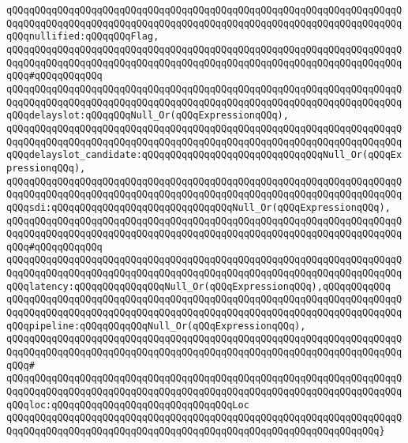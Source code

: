 \verb|qQQqqQQqqQQqqQQqqQQqqQQqqQQqqQQqqQQqqQQqqQQqqQQqqQQqqQQqqQQqqQQqqQQqqQQqqQQqqQQqqQQqqQQqqQQqqQQqqQQqqQQqqQQqqQQqqQQqqQQqqQQqqQQqqQQqqQQqqQQqqQQqnullified:qQQqqQQqFlag,|\newline
\verb|qQQqqQQqqQQqqQQqqQQqqQQqqQQqqQQqqQQqqQQqqQQqqQQqqQQqqQQqqQQqqQQqqQQqqQQqqQQqqQQqqQQqqQQqqQQqqQQqqQQqqQQqqQQqqQQqqQQqqQQqqQQqqQQqqQQqqQQqqQQqqQQq#qQQqqQQqqQQq|\newline
\verb|qQQqqQQqqQQqqQQqqQQqqQQqqQQqqQQqqQQqqQQqqQQqqQQqqQQqqQQqqQQqqQQqqQQqqQQqqQQqqQQqqQQqqQQqqQQqqQQqqQQqqQQqqQQqqQQqqQQqqQQqqQQqqQQqqQQqqQQqqQQqqQQqdelayslot:qQQqqQQqNull_Or(qQQqExpressionqQQq),|\newline
\verb|qQQqqQQqqQQqqQQqqQQqqQQqqQQqqQQqqQQqqQQqqQQqqQQqqQQqqQQqqQQqqQQqqQQqqQQqqQQqqQQqqQQqqQQqqQQqqQQqqQQqqQQqqQQqqQQqqQQqqQQqqQQqqQQqqQQqqQQqqQQqqQQqdelayslot_candidate:qQQqqQQqqQQqqQQqqQQqqQQqqQQqqQQqNull_Or(qQQqExpressionqQQq),|\newline
\verb|qQQqqQQqqQQqqQQqqQQqqQQqqQQqqQQqqQQqqQQqqQQqqQQqqQQqqQQqqQQqqQQqqQQqqQQqqQQqqQQqqQQqqQQqqQQqqQQqqQQqqQQqqQQqqQQqqQQqqQQqqQQqqQQqqQQqqQQqqQQqqQQqsdi:qQQqqQQqqQQqqQQqqQQqqQQqqQQqqQQqNull_Or(qQQqExpressionqQQq),|\newline
\verb|qQQqqQQqqQQqqQQqqQQqqQQqqQQqqQQqqQQqqQQqqQQqqQQqqQQqqQQqqQQqqQQqqQQqqQQqqQQqqQQqqQQqqQQqqQQqqQQqqQQqqQQqqQQqqQQqqQQqqQQqqQQqqQQqqQQqqQQqqQQqqQQq#qQQqqQQqqQQq|\newline
\verb|qQQqqQQqqQQqqQQqqQQqqQQqqQQqqQQqqQQqqQQqqQQqqQQqqQQqqQQqqQQqqQQqqQQqqQQqqQQqqQQqqQQqqQQqqQQqqQQqqQQqqQQqqQQqqQQqqQQqqQQqqQQqqQQqqQQqqQQqqQQqqQQqlatency:qQQqqQQqqQQqqQQqNull_Or(qQQqExpressionqQQq),qQQqqQQqqQQq|\newline
\verb|qQQqqQQqqQQqqQQqqQQqqQQqqQQqqQQqqQQqqQQqqQQqqQQqqQQqqQQqqQQqqQQqqQQqqQQqqQQqqQQqqQQqqQQqqQQqqQQqqQQqqQQqqQQqqQQqqQQqqQQqqQQqqQQqqQQqqQQqqQQqqQQqpipeline:qQQqqQQqqQQqNull_Or(qQQqExpressionqQQq),|\newline
\verb|qQQqqQQqqQQqqQQqqQQqqQQqqQQqqQQqqQQqqQQqqQQqqQQqqQQqqQQqqQQqqQQqqQQqqQQqqQQqqQQqqQQqqQQqqQQqqQQqqQQqqQQqqQQqqQQqqQQqqQQqqQQqqQQqqQQqqQQqqQQqqQQq#|\newline
\verb|qQQqqQQqqQQqqQQqqQQqqQQqqQQqqQQqqQQqqQQqqQQqqQQqqQQqqQQqqQQqqQQqqQQqqQQqqQQqqQQqqQQqqQQqqQQqqQQqqQQqqQQqqQQqqQQqqQQqqQQqqQQqqQQqqQQqqQQqqQQqqQQqloc:qQQqqQQqqQQqqQQqqQQqqQQqqQQqqQQqLoc|\newline
\verb|qQQqqQQqqQQqqQQqqQQqqQQqqQQqqQQqqQQqqQQqqQQqqQQqqQQqqQQqqQQqqQQqqQQqqQQqqQQqqQQqqQQqqQQqqQQqqQQqqQQqqQQqqQQqqQQqqQQqqQQqqQQqqQQqqQQqqQQq}|\newline
\newline
